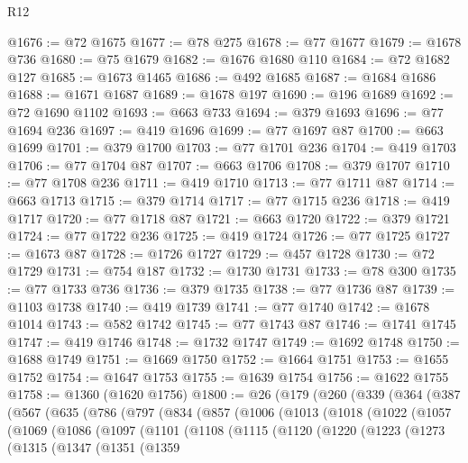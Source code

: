 \begin{lexlean}{R12}
\begin{coremodule}
@1676 := @72 @1675
@1677 := @78 @275
@1678 := @77 @1677
@1679 := @1678 @736
@1680 := @75 @1679
@1682 := @1676 @1680 @110
@1684 := @72 @1682 @127
@1685 := @1673 @1465
@1686 := @492 @1685
@1687 := @1684 @1686
@1688 := @1671 @1687
@1689 := @1678 @197
@1690 := @196 @1689
@1692 := @72 @1690 @1102
@1693 := @663 @733
@1694 := @379 @1693
@1696 := @77 @1694 @236
@1697 := @419 @1696
@1699 := @77 @1697 @87
@1700 := @663 @1699
@1701 := @379 @1700
@1703 := @77 @1701 @236
@1704 := @419 @1703
@1706 := @77 @1704 @87
@1707 := @663 @1706
@1708 := @379 @1707
@1710 := @77 @1708 @236
@1711 := @419 @1710
@1713 := @77 @1711 @87
@1714 := @663 @1713
@1715 := @379 @1714
@1717 := @77 @1715 @236
@1718 := @419 @1717
@1720 := @77 @1718 @87
@1721 := @663 @1720
@1722 := @379 @1721
@1724 := @77 @1722 @236
@1725 := @419 @1724
@1726 := @77 @1725
@1727 := @1673 @87
@1728 := @1726 @1727
@1729 := @457 @1728
@1730 := @72 @1729
@1731 := @754 @187
@1732 := @1730 @1731
@1733 := @78 @300
@1735 := @77 @1733 @736
@1736 := @379 @1735
@1738 := @77 @1736 @87
@1739 := @1103 @1738
@1740 := @419 @1739
@1741 := @77 @1740
@1742 := @1678 @1014
@1743 := @582 @1742
@1745 := @77 @1743 @87
@1746 := @1741 @1745
@1747 := @419 @1746
@1748 := @1732 @1747
@1749 := @1692 @1748
@1750 := @1688 @1749
@1751 := @1669 @1750
@1752 := @1664 @1751
@1753 := @1655 @1752
@1754 := @1647 @1753
@1755 := @1639 @1754
@1756 := @1622 @1755
@1758 := @1360 (@1620 @1756)
@1800 := @26
    (@179
      (@260
        (@339
          (@364
            (@387
              (@567
                (@635
                  (@786
                    (@797
                      (@834
                        (@857
                          (@1006
                            (@1013
                              (@1018
                                (@1022
                                  (@1057
                                    (@1069
                                      (@1086
                                        (@1097
                                          (@1101
                                            (@1108
                                              (@1115
                                                (@1120
                                                  (@1220
                                                    (@1223
                                                      (@1273
                                                        (@1315
                                                          (@1347
                                                            (@1351
                                                              (@1359

\end{coremodule}
\end{lexlean}
